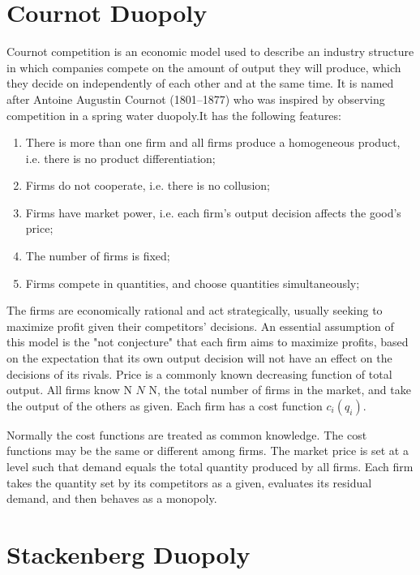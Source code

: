\documentclass[a4paper,12pt]{article}
\begin{document}
\section{Cournot Duopoly}

Cournot competition is an economic model used to describe an industry structure in which companies compete on the amount of output they will produce, which they decide on independently of each other and at the same time. It is named after Antoine Augustin Cournot (1801–1877) who was inspired by observing competition in a spring water duopoly.It has the following features:

\begin{enumerate}
\item There is more than one firm and all firms produce a homogeneous product, i.e. there is no product differentiation;
\item Firms do not cooperate, i.e. there is no collusion;
\item Firms have market power, i.e. each firm's output decision affects the good's price;
\item The number of firms is fixed;
\item Firms compete in quantities, and choose quantities simultaneously;
\end{enumerate}
The firms are economically rational and act strategically, usually seeking to maximize profit given their competitors' decisions.
An essential assumption of this model is the "not conjecture" that each firm aims to maximize profits, based on the expectation that its own output decision will not have an effect on the decisions of its rivals. Price is a commonly known decreasing function of total output. All firms know N ${\displaystyle N}$ N, the total number of firms in the market, and take the output of the others as given. Each firm has a cost function ${\displaystyle c_{i}(q_{i})}$. 

Normally the cost functions are treated as common knowledge. The cost functions may be the same or different among firms. The market price is set at a level such that demand equals the total quantity produced by all firms. Each firm takes the quantity set by its competitors as a given, evaluates its residual demand, and then behaves as a monopoly.

\section{Stackenberg Duopoly}
\end{document}
